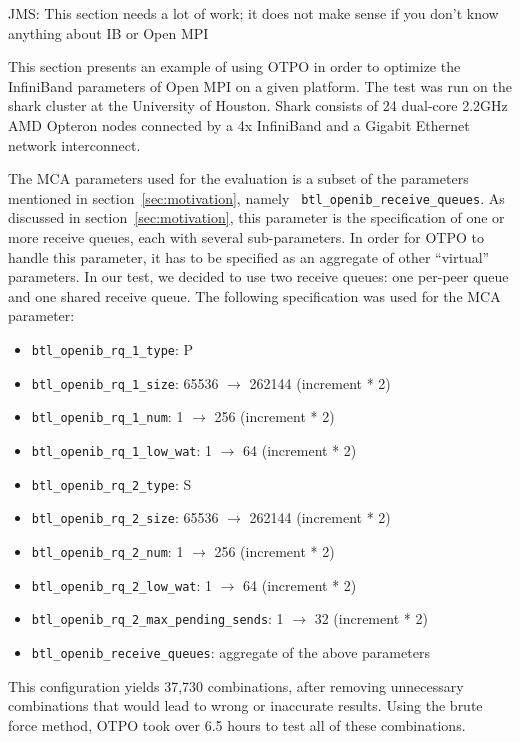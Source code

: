 {\Large JMS: This section needs a lot of work; it does not make sense if
  you don't know anything about IB or Open MPI}

This section presents an example of using OTPO in order to optimize
the InfiniBand parameters of Open MPI on a given platform. The test
was run on the shark cluster at the University of Houston. Shark
consists of 24 dual-core 2.2GHz AMD Opteron nodes connected by a 4x
InfiniBand and a Gigabit Ethernet network interconnect.

The MCA parameters used for the evaluation is a subset of the
parameters mentioned in section~\ref{sec:motivation}, namely {\tt
  btl\_openib\_receive\_queues}. As discussed in
section~\ref{sec:motivation}, this parameter is the specification of
one or more receive queues, each with several sub-parameters.  In
order for OTPO to handle this parameter, it has to be specified as an
aggregate of other ``virtual'' parameters. In our test, we decided to
use two receive queues: one per-peer queue and one shared receive
queue. The following specification was used for the MCA parameter:

\begin{itemize}
\item {\tt btl\_openib\_rq\_1\_type}: P
\item {\tt btl\_openib\_rq\_1\_size}: 65536 $\rightarrow$ 262144
  (increment * 2)
\item {\tt btl\_openib\_rq\_1\_num}: 1 $\rightarrow$ 256 (increment *
  2)
\item {\tt btl\_openib\_rq\_1\_low\_wat}: 1 $\rightarrow$ 64
  (increment * 2)
\item {\tt btl\_openib\_rq\_2\_type}: S
\item {\tt btl\_openib\_rq\_2\_size}: 65536 $\rightarrow$ 262144
  (increment * 2)
\item {\tt btl\_openib\_rq\_2\_num}: 1 $\rightarrow$ 256 (increment *
  2)
\item {\tt btl\_openib\_rq\_2\_low\_wat}: 1 $\rightarrow$ 64
  (increment * 2)
\item {\tt btl\_openib\_rq\_2\_max\_pending\_sends}: 1 $\rightarrow$
  32 (increment * 2)
\item {\tt btl\_openib\_receive\_queues}: aggregate of the above
  parameters
\end{itemize}

This configuration yields 37,730 combinations, after removing
unnecessary combinations that would lead to wrong or inaccurate
results.  Using the brute force method, OTPO took over 6.5 hours to
test all of these combinations.

